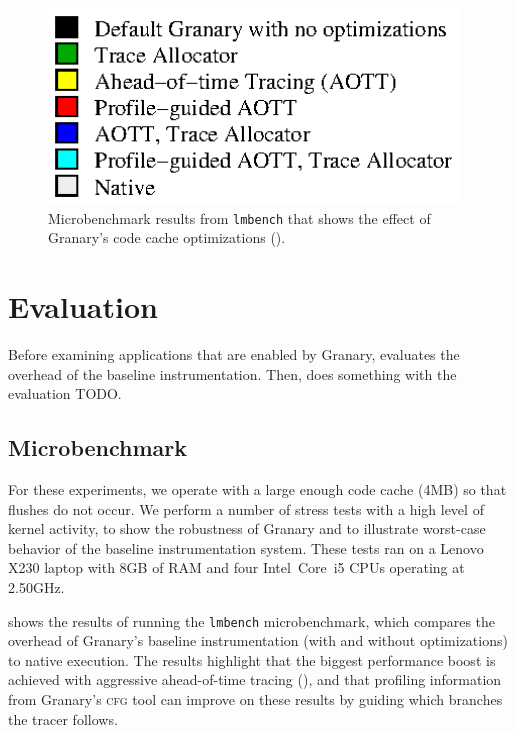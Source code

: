 \documentclass[preprint]{sigplanconf}
\newcommand{\toolname}[1]{{\scshape #1}}
\begin{document}
\begin{figure}[ht!]
\includegraphics[height=14em,clip=true,trim=0 -5em 10em -5em]{charts/lmbench_legend.eps}
\caption{\label{fig:lmbench}Microbenchmark results from \texttt{lmbench} that shows the effect of Granary's code cache optimizations ().}
\end{figure}

\section{Evaluation}\label{sec:eval}

Before examining applications that are enabled by Granary,  evaluates the overhead of the baseline instrumentation. Then,  does something with the evaluation TODO.

\subsection{Microbenchmark}\label{sec:microbench}
For these experiments, we operate with a large enough code cache (\texttildelow 4MB) so that flushes do not occur. We perform a number of stress tests with a high level of kernel activity, to show the robustness of Granary and to illustrate worst-case behavior of the baseline instrumentation system. These tests ran on a Lenovo X230 laptop with 8GB of RAM and four Intel\textregistered\ Core\texttrademark\ i5 CPUs operating at 2.50GHz.

 shows the results of running the \texttt{lmbench} microbenchmark, which compares the overhead of Granary's baseline instrumentation (with and without optimizations) to native execution. The results highlight that the biggest performance boost is achieved with aggressive ahead-of-time tracing (), and that profiling information from Granary's \toolname{cfg} tool can improve on these results by guiding which branches the tracer follows.
\end{document}
